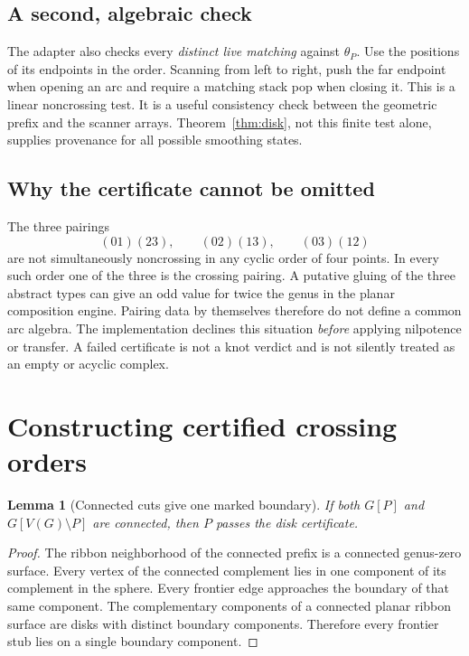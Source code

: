 \documentclass[11pt]{article}
\newtheorem{lemma}[theorem]{Lemma}
\theoremstyle{definition}\newtheorem{definition}[theorem]{Definition}
\theoremstyle{remark}\newtheorem{remark}[theorem]{Remark}
\begin{document}
\subsection{A second, algebraic check}
The adapter also checks every \emph{distinct live matching} against $\theta_P$.
Use the positions of its endpoints in the order. Scanning from left to right,
push the far endpoint when opening an arc and require a matching stack pop when
closing it. This is a linear noncrossing test. It is a useful consistency check
between the geometric prefix and the scanner arrays. Theorem~\ref{thm:disk},
not this finite test alone, supplies provenance for all possible smoothing states.

\subsection{Why the certificate cannot be omitted}
The three pairings
\[
 (01)(23),\qquad(02)(13),\qquad(03)(12)
\]
are not simultaneously noncrossing in any cyclic order of four points. In every
such order one of the three is the crossing pairing. A putative gluing of the
three abstract types can give an odd value for twice the genus in the planar
composition engine. Pairing data by themselves therefore do not define a common
arc algebra. The implementation declines this situation \emph{before} applying
nilpotence or transfer. A failed certificate is not a knot verdict and is not
silently treated as an empty or acyclic complex.

\section{Constructing certified crossing orders}
\label{sec:orders}
\begin{lemma}[Connected cuts give one marked boundary]\label{lem:bond}
If both $G[P]$ and $G[V(G)\setminus P]$ are connected, then $P$ passes the disk
certificate.
\end{lemma}
\begin{proof}
The ribbon neighborhood of the connected prefix is a connected genus-zero
surface. Every vertex of the connected complement lies in one component of its
complement in the sphere. Every frontier edge approaches the boundary of that
same component. The complementary components of a connected planar ribbon
surface are disks with distinct boundary components. Therefore every frontier
stub lies on a single boundary component.
\end{proof}
\end{document}
